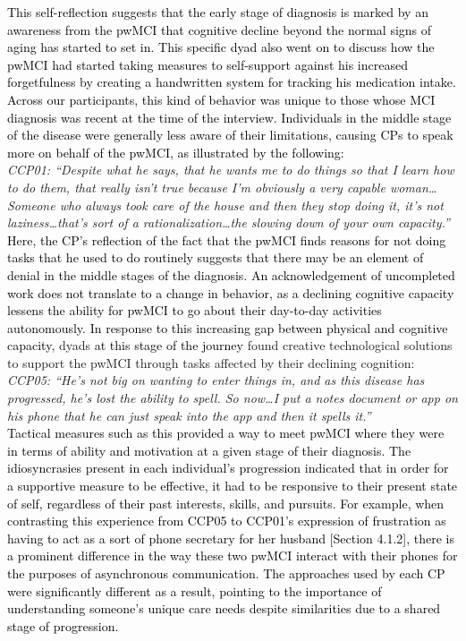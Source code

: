\documentclass[acmsmall]{acmart}
\begin{document}
\textcolor{black}{This self-reflection suggests that the early stage of diagnosis is marked by an awareness from the pwMCI that cognitive decline beyond the normal signs of aging has started to set in. This specific dyad also went on to discuss how the pwMCI had started taking measures to self-support against his increased forgetfulness by creating a handwritten system for tracking his medication intake. Across our participants, this kind of behavior was unique to those whose MCI diagnosis was recent at the time of the interview.} 
\textcolor{black}{Individuals in the middle stage of the disease were generally less aware of their limitations, \textcolor{black}{causing CPs to speak more on behalf of the pwMCI,} as illustrated by the following:}
\\

\textit{CCP01: “Despite what he says, that he wants me to do things so that I learn how to do them, that really isn't true because I'm obviously a very capable woman…Someone who always took care of the house and then they stop doing it, it's not laziness…that's sort of a rationalization…the slowing down of your own capacity.”}
\\

\textcolor{black}{Here, the CP’s reflection of the fact that the pwMCI finds reasons for not doing tasks that he used to do routinely suggests that there may be an element of denial in the middle stages of the diagnosis. An acknowledgement of uncompleted work does not translate to a change in behavior, as a declining cognitive capacity lessens the ability for pwMCI to go about their day-to-day activities autonomously. In response to this increasing gap between physical and cognitive capacity,} dyads \textcolor{black}{at this stage of the journey} found creative technological solutions to support the pwMCI through tasks affected by their declining cognition:
\\

\textit{CCP05: “He's not big on wanting to enter things in, and as this disease has progressed, he's lost the ability to spell. So now…I put a notes document or app on his phone that he can just speak into the app and then it spells it.”}
\\

\textcolor{black}{Tactical measures such as this provided a way to meet pwMCI where they were in terms of ability and motivation at a given stage of their diagnosis. The idiosyncrasies present in each individual’s progression indicated that in order for a supportive measure to be effective, it had to be responsive to their present state of self, regardless of their past interests, skills, and pursuits. For example, when contrasting this experience from CCP05 to CCP01’s expression of frustration as having to act as a sort of phone secretary for her husband [Section 4.1.2], there is a prominent difference in the way these two pwMCI interact with their phones for the purposes of asynchronous communication. The approaches used by each CP were significantly different as a result, pointing to the importance of understanding someone’s unique care needs despite similarities due to a shared stage of progression.}
\end{document}

